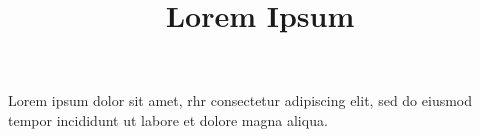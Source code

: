 \documentclass[a4paper,11pt,oneside]{book}
\title{\Huge \textbf{Lorem Ipsum}}
\author{\textsc{}}
\begin{document}
\sloppy

\frontmatter
\maketitle

\tableofcontents

\mainmatter

% 
% 

Lorem ipsum dolor sit amet, \acrshort{rhr} consectetur adipiscing elit, sed do eiusmod tempor incididunt ut labore et dolore magna aliqua.
\printglossaries
\end{document}
